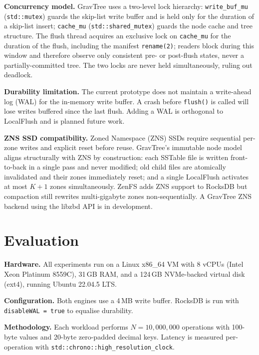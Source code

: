 \documentclass{jors}
\begin{document}
\textbf{Concurrency model.} GravTree uses a two-level lock hierarchy:
\texttt{write\_buf\_mu} (\texttt{std::mutex}) guards the skip-list write
buffer and is held only for the duration of a skip-list insert;
\texttt{cache\_mu} (\texttt{std::shared\_mutex}) guards the node cache
and tree structure. The flush thread acquires an exclusive lock on
\texttt{cache\_mu} for the duration of the flush, including the manifest
\texttt{rename(2)}; readers block during this window and therefore
observe only consistent pre- or post-flush states, never a
partially-committed tree. The two locks are never held simultaneously,
ruling out deadlock.

\textbf{Durability limitation.} The current prototype does not maintain a
write-ahead log (WAL) for the in-memory write buffer. A crash before
\texttt{flush()} is called will lose writes buffered since the last flush.
Adding a WAL is orthogonal to LocalFlush and is planned future work.

\textbf{ZNS SSD compatibility.} Zoned Namespace (ZNS) SSDs
\citep{zns} require sequential per-zone writes and explicit reset before
reuse. GravTree's immutable node model aligns structurally with ZNS by
construction: each SSTable file is written front-to-back in a single pass
and never modified; old child files are atomically invalidated and their
zones immediately reset; and a single LocalFlush activates at most $K+1$
zones simultaneously. ZenFS \citep{zenfs} adds ZNS support to RocksDB
but compaction still rewrites multi-gigabyte zones non-sequentially. A
GravTree ZNS backend using the libzbd API \citep{libzbd} is in
development.

\section*{Evaluation}

\textbf{Hardware.} All experiments run on a Linux x86\_64 VM with 8
vCPUs (Intel Xeon Platinum 8559C), 31\,GB RAM, and a 124\,GB NVMe-backed
virtual disk (ext4), running Ubuntu 22.04.5 LTS.

\textbf{Configuration.} Both engines use a 4\,MB write buffer. RocksDB
is run with \texttt{disableWAL = true} to equalise durability.

\textbf{Methodology.} Each workload performs $N = 10{,}000{,}000$
operations with 100-byte values and 20-byte zero-padded decimal keys.
Latency is measured per-operation with
\texttt{std::chrono::high\_resolution\_clock}.
\end{document}
